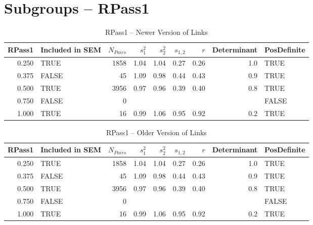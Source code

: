 \documentclass{article}\usepackage{graphicx, color}
\begin{document}
\section{Subgroups --  RPass1 }%
\begin{table}[ht]
\begin{center}
\begin{tabular}{rlrrrrrrl}
  \hline
RPass1 & Included in SEM & $N_{Pairs}$ & $s_1^2$ & $s_2^2$ & $s_{1,2}$ & $r$ & Determinant & PosDefinite \\ 
  \hline
0.250 & TRUE & 1858 & 1.04 & 1.04 & 0.27 & 0.26 & 1.0 & TRUE \\ 
  0.375 & FALSE & 45 & 1.09 & 0.98 & 0.44 & 0.43 & 0.9 & TRUE \\ 
  0.500 & TRUE & 3956 & 0.97 & 0.96 & 0.39 & 0.40 & 0.8 & TRUE \\ 
  0.750 & FALSE & 0 &  &  &  &  &  & FALSE \\ 
  1.000 & TRUE & 16 & 0.99 & 1.06 & 0.95 & 0.92 & 0.2 & TRUE \\ 
   \hline
\end{tabular}
\caption{RPass1 -- Newer Version of Links}
\end{center}
\end{table}
\begin{table}[ht]
\begin{center}
\begin{tabular}{rlrrrrrrl}
  \hline
RPass1 & Included in SEM & $N_{Pairs}$ & $s_1^2$ & $s_2^2$ & $s_{1,2}$ & $r$ & Determinant & PosDefinite \\ 
  \hline
0.250 & TRUE & 1858 & 1.04 & 1.04 & 0.27 & 0.26 & 1.0 & TRUE \\ 
  0.375 & FALSE & 45 & 1.09 & 0.98 & 0.44 & 0.43 & 0.9 & TRUE \\ 
  0.500 & TRUE & 3956 & 0.97 & 0.96 & 0.39 & 0.40 & 0.8 & TRUE \\ 
  0.750 & FALSE & 0 &  &  &  &  &  & FALSE \\ 
  1.000 & TRUE & 16 & 0.99 & 1.06 & 0.95 & 0.92 & 0.2 & TRUE \\ 
   \hline
\end{tabular}
\caption{RPass1 -- Older Version of Links}
\end{center}
\end{table}
\end{document}
